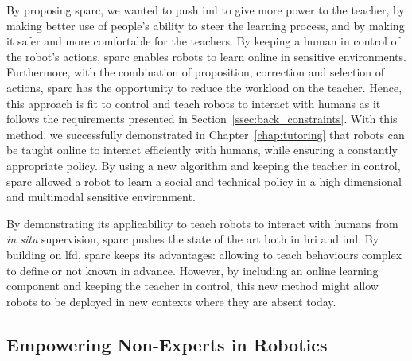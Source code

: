 By proposing \gls{sparc}, we wanted to push \gls{iml} to give more power to the teacher, by making better use of people's ability to steer the learning process, and by making it safer and more comfortable for the teachers. By keeping a human in control of the robot's actions, \gls{sparc} enables robots to learn online in sensitive environments. %
Furthermore, with the combination of proposition, correction and selection of actions, \gls{sparc} has the opportunity to reduce the workload on the teacher. Hence, this approach is fit to control and teach robots to interact with humans as it follows the requirements presented in Section~\ref{ssec:back_constraints}. With this method, we successfully demonstrated in Chapter~\ref{chap:tutoring} that robots can be taught online to interact efficiently with humans, while ensuring a constantly appropriate policy. By using a new algorithm and keeping the teacher in control, \gls{sparc} allowed a robot to learn a social and technical policy in a high dimensional and multimodal sensitive environment.

By demonstrating its applicability to teach robots to interact with humans from \textit{in situ} supervision, \gls{sparc} pushes the state of the art both in \gls{hri} and \gls{iml}. By building on \gls{lfd}, \gls{sparc} keeps its advantages: allowing to teach behaviours complex to define or not known in advance. However, by including an online learning component and keeping the teacher in control, this new method might allow robots to be deployed in new contexts where they are absent today.


\subsection{Empowering Non-Experts in Robotics}

